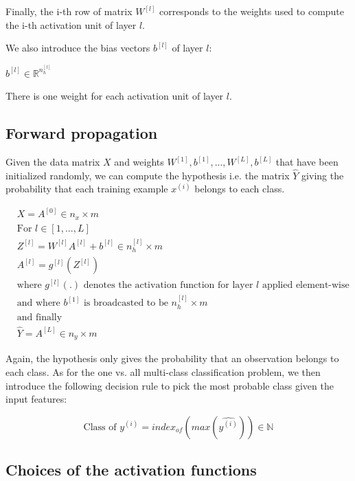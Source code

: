 \documentclass[a4paper, 12pt]{article}
\begin{document}
Finally, the i-th row of matrix $W^{[l]}$ corresponds to the weights used to compute the i-th activation unit of layer $l$.

We also introduce the bias vectors $b^{[l]}$ of layer $l$:

$b^{[l]} \in \mathbb{R}^{n_h^{[l]}}$

There is one weight for each activation unit of layer $l$.

\subsection{Forward propagation}

Given the data matrix $X$ and weights $W^{[1]}, b^{[1]}, ..., W^{[L]}, b^{[L]}$ that have been initialized randomly, we can compute the hypothesis i.e. the matrix $\hat{Y}$ giving the probability that each training example $x^{(i)}$ belongs to each class.

\begin{align*}
& X = A^{[0]} \in n_x \times m  \\
& \text{For } l \in [1, ..., L] \\
&  Z^{[l]} = W^{[l]}A^{[l]} + b^{[l]} \in n_h^{[l]} \times m \\
&  A^{[l]} = g^{[l]} \left(Z^{[l]}\right) \\
& \text{where } g^{[l]}(.) \text{ denotes the activation function for layer } l \text{ applied element-wise} \\
& \text{and where } b^{[1]}  \text{ is broadcasted to be } n_h^{[l]} \times m \\
& \text{and finally } \\
& \hat{Y} = A^{[L]} \in n_y \times m
\end{align*}

Again, the hypothesis only gives the probability that an observation belongs to each class. As for the one vs. all multi-class classification problem, we then introduce the following decision rule to pick the most probable class given the input features:

\begin{equation}
\text{Class of } y^{(i)} = index_{of}\left( max(\hat{y^{(i)}}) \right) \in \mathbb{N}
\end{equation}

\subsection{Choices of the activation functions}
\end{document}
